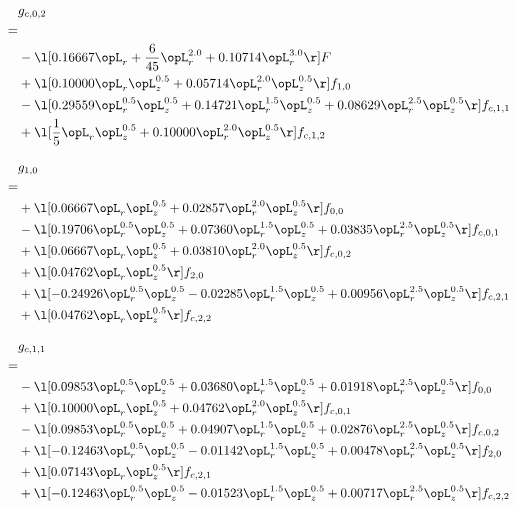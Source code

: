 \begin{alignat}{2} 
\label{eq:g_02_0} 
& g_{c,0,2} \nonumber \\ 
 = \\ 
& - \l[  0.16667 \opL_r + \frac{6}{45} \opL_r^{2.0} +  0.10714 \opL_r^{3.0}  \r] F \nonumber \\ 
& + \l[  0.10000 \opL_r \opL_z^{0.5} +  0.05714 \opL_r^{2.0} \opL_z^{0.5}  \r] f_{1,0} \nonumber \\ 
& - \l[  0.29559 \opL_r^{0.5} \opL_z^{0.5} +  0.14721 \opL_r^{1.5} \opL_z^{0.5} +  0.08629 \opL_r^{2.5} \opL_z^{0.5}  \r] f_{c,1,1} \nonumber \\ 
& + \l[ \frac{1}{5} \opL_r \opL_z^{0.5} +  0.10000 \opL_r^{2.0} \opL_z^{0.5}  \r] f_{c,1,2} \nonumber \\ 
\end{alignat} 


\begin{alignat}{2} 
\label{eq:g_10_0} 
& g_{1,0} \nonumber \\ 
 = \\ 
& + \l[  0.06667 \opL_r \opL_z^{0.5} +  0.02857 \opL_r^{2.0} \opL_z^{0.5}  \r] f_{0,0} \nonumber \\ 
& - \l[  0.19706 \opL_r^{0.5} \opL_z^{0.5} +  0.07360 \opL_r^{1.5} \opL_z^{0.5} +  0.03835 \opL_r^{2.5} \opL_z^{0.5}  \r] f_{c,0,1} \nonumber \\ 
& + \l[  0.06667 \opL_r \opL_z^{0.5} +  0.03810 \opL_r^{2.0} \opL_z^{0.5}  \r] f_{c,0,2} \nonumber \\ 
& + \l[  0.04762 \opL_r \opL_z^{0.5}  \r] f_{2,0} \nonumber \\ 
& + \l[  -0.24926 \opL_r^{0.5} \opL_z^{0.5}   -0.02285 \opL_r^{1.5} \opL_z^{0.5} +  0.00956 \opL_r^{2.5} \opL_z^{0.5}  \r] f_{c,2,1} \nonumber \\ 
& + \l[  0.04762 \opL_r \opL_z^{0.5}  \r] f_{c,2,2} \nonumber \\ 
\end{alignat} 


\begin{alignat}{2} 
\label{eq:g_11_0} 
& g_{c,1,1} \nonumber \\ 
 = \\ 
& - \l[  0.09853 \opL_r^{0.5} \opL_z^{0.5} +  0.03680 \opL_r^{1.5} \opL_z^{0.5} +  0.01918 \opL_r^{2.5} \opL_z^{0.5}  \r] f_{0,0} \nonumber \\ 
& + \l[  0.10000 \opL_r \opL_z^{0.5} +  0.04762 \opL_r^{2.0} \opL_z^{0.5}  \r] f_{c,0,1} \nonumber \\ 
& - \l[  0.09853 \opL_r^{0.5} \opL_z^{0.5} +  0.04907 \opL_r^{1.5} \opL_z^{0.5} +  0.02876 \opL_r^{2.5} \opL_z^{0.5}  \r] f_{c,0,2} \nonumber \\ 
& + \l[  -0.12463 \opL_r^{0.5} \opL_z^{0.5}   -0.01142 \opL_r^{1.5} \opL_z^{0.5} +  0.00478 \opL_r^{2.5} \opL_z^{0.5}  \r] f_{2,0} \nonumber \\ 
& + \l[  0.07143 \opL_r \opL_z^{0.5}  \r] f_{c,2,1} \nonumber \\ 
& + \l[  -0.12463 \opL_r^{0.5} \opL_z^{0.5}   -0.01523 \opL_r^{1.5} \opL_z^{0.5} +  0.00717 \opL_r^{2.5} \opL_z^{0.5}  \r] f_{c,2,2} \nonumber \\ 
\end{alignat} 


